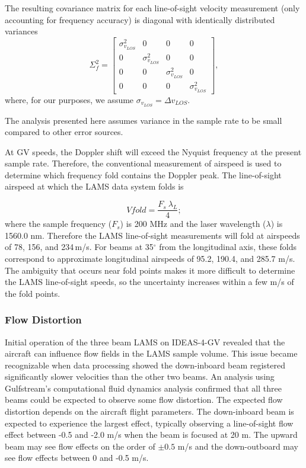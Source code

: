 \documentclass[12pt,twoside,english]{article}\usepackage[]{graphicx}\usepackage[]{color}
\let\OrgIndex\index
\renewcommand*{\index}[1]{\OrgIndex{#1}}
\begin{document}
The resulting covariance matrix for each line-of-sight velocity measurement (only accounting for frequency accuracy) is diagonal with identically distributed variances  
\begin{equation}
\Sigma_{f}^{2}=\left[\begin{array}{cccc} 
\sigma_{v_{LOS}}^{2} & 0 & 0 & 0\\ 0 & \sigma_{v_{LOS}}^{2} & 0 & 0\\ 0 & 0 & \sigma_{v_{LOS}}^{2} & 0\\ 0 & 0 & 0 & \sigma_{v_{LOS}}^{2} \end{array}\right],\label{CovFreq} 
\end{equation}
where, for our purposes, we assume $\sigma_{v_{LOS}}=\Delta v_{LOS}$. 

The analysis presented here assumes variance in the sample rate to be small compared to other error sources. 

At GV speeds, the Doppler shift will exceed the Nyquist frequency at the present sample rate. Therefore, the conventional measurement of airspeed is used
to determine which frequency fold contains the Doppler peak. The line-of-sight airspeed
at which the LAMS data system folds is

\begin{equation}
V{fold} = \frac{F_s~\lambda_L}{4}; %
\end{equation}
where the sample frequency ($F_s$) is 200 MHz and the laser wavelength ($\lambda$) is 1560.0 nm.  
Therefore the LAMS line-of-sight measurements will fold at airspeeds of 78,
156, and 234\,m/s. For beams at 35$^{\circ}$ from the longitudinal axis, these 
folds correspond to approximate longitudinal airspeeds of 95.2, 190.4, and 
285.7 m/s.
The ambiguity that occurs near fold points makes it more difficult to 
determine the LAMS line-of-sight speeds,
so the uncertainty increases within a few m/s of the fold points.

\subsubsection{Flow Distortion}

Initial operation of the three beam  LAMS on IDEAS-4-GV revealed that the aircraft can influence flow fields in the LAMS sample volume. This issue became recognizable when data processing showed the down-inboard beam registered significantly slower velocities than the other two beams. An analysis using Gulfstream's computational fluid dynamics analysis confirmed that all three beams could be expected to observe some flow distortion. The expected flow distortion depends on the aircraft flight parameters. The down-inboard beam is expected to experience the largest effect, typically observing a line-of-sight flow effect between -0.5 and -2.0 m/s when the beam is focused at 20 m. The upward beam may see flow effects on the order of $\pm0.5$ m/s and the down-outboard may see flow effects between 0 and -0.5 m/s. 
\end{document}
